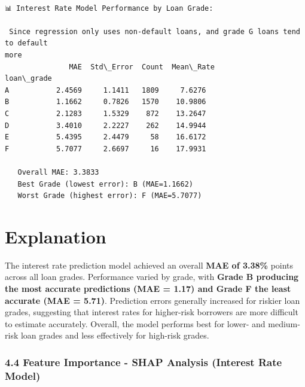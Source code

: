 \documentclass[11pt]{article}
\begin{document}
    \begin{Verbatim}[commandchars=\\\{\}]

📊 Interest Rate Model Performance by Loan Grade:

 Since regression only uses non-default loans, and grade G loans tend to default
more
               MAE  Std\_Error  Count  Mean\_Rate
loan\_grade
A           2.4569     1.1411   1809     7.6276
B           1.1662     0.7826   1570    10.9806
C           2.1283     1.5329    872    13.2647
D           3.4010     2.2227    262    14.9944
E           5.4395     2.4479     58    16.6172
F           5.7077     2.6697     16    17.9931

   Overall MAE: 3.3833
   Best Grade (lowest error): B (MAE=1.1662)
   Worst Grade (highest error): F (MAE=5.7077)
    \end{Verbatim}

    \section{Explanation}\label{explanation}

The interest rate prediction model achieved an overall \textbf{MAE of
3.38\%} points across all loan grades. Performance varied by grade, with
\textbf{Grade B producing the most accurate predictions (MAE = 1.17) and
Grade F the least accurate (MAE = 5.71)}. Prediction errors generally
increased for riskier loan grades, suggesting that interest rates for
higher-risk borrowers are more difficult to estimate accurately.
Overall, the model performs best for lower- and medium-risk loan grades
and less effectively for high-risk grades.

    \subsubsection{4.4 Feature Importance - SHAP Analysis (Interest Rate
Model)}\label{feature-importance---shap-analysis-interest-rate-model}
\end{document}
